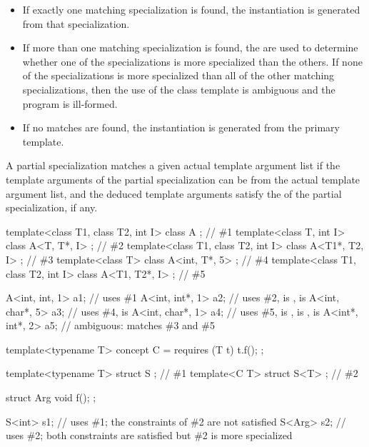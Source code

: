 \begin{itemize}
\item
If exactly one matching specialization is found, the instantiation is
generated from that specialization.
\item
If more than one matching specialization is found,
the  are used to determine
whether one of the specializations is more specialized than the
others.
If none of the specializations is more specialized than all of the
other matching specializations, then the use of the class template
is ambiguous and the program is ill-formed.
\item
If no matches are found, the instantiation is generated from the
primary template.
\end{itemize}

\pnum
A partial specialization matches a given actual template argument
list if the template arguments of the partial specialization can be
 from the actual template argument list,
and the deduced template arguments satisfy the 
of the partial specialization, if any.
\begin{example}
\begin{codeblock}
template<class T1, class T2, int I> class A             { };    // \#1
template<class T, int I>            class A<T, T*, I>   { };    // \#2
template<class T1, class T2, int I> class A<T1*, T2, I> { };    // \#3
template<class T>                   class A<int, T*, 5> { };    // \#4
template<class T1, class T2, int I> class A<T1, T2*, I> { };    // \#5

A<int, int, 1>   a1;                    // uses \#1
A<int, int*, 1>  a2;                    // uses \#2,  is ,  is 
A<int, char*, 5> a3;                    // uses \#4,  is 
A<int, char*, 1> a4;                    // uses \#5,  is ,  is ,  is 
A<int*, int*, 2> a5;                    // ambiguous: matches \#3 and \#5
\end{codeblock}
\end{example}
\begin{example}
\begin{codeblock}
template<typename T> concept C = requires (T t) { t.f(); };

template<typename T> struct S { };      // \#1
template<C T> struct S<T> { };          // \#2

struct Arg { void f(); };

S<int> s1;                              // uses \#1; the constraints of \#2 are not satisfied
S<Arg> s2;                              // uses \#2; both constraints are satisfied but \#2 is more specialized
\end{codeblock}
\end{example}

